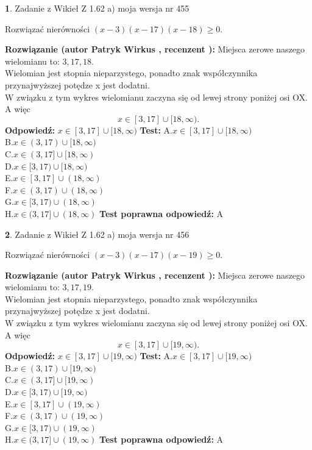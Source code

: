\documentclass[12pt, a4paper]{article}
\theoremstyle{definition} %
\newtheorem{zad}{}
\newcommand{\zadStart}[1]{\begin{zad}#1\newline}
\newcommand{\zadStop}{\end{zad}}
\newcommand{\rozwStart}[2]{\noindent \textbf{Rozwiązanie (autor #1 , recenzent #2): }\newline}
\newcommand{\rozwStop}{\newline}
\newcommand{\odpStart}{\noindent \textbf{Odpowiedź:}\newline}
\newcommand{\odpStop}{\newline}
\newcommand{\testStart}{\noindent \textbf{Test:}\newline}
\newcommand{\testStop}{\newline}
\newcommand{\kluczStart}{\noindent \textbf{Test poprawna odpowiedź:}\newline}
\newcommand{\kluczStop}{\newline}
\begin{document}
\zadStart{Zadanie z Wikieł Z 1.62 a) moja wersja nr 455}

Rozwiązać nierówności $(x-3)(x-17)(x-18)\ge0$.
\zadStop
\rozwStart{Patryk Wirkus}{}
Miejsca zerowe naszego wielomianu to: $3, 17, 18$.\\
Wielomian jest stopnia nieparzystego, ponadto znak współczynnika przy\linebreak najwyższej potędze x jest dodatni.\\ W związku z tym wykres wielomianu zaczyna się od lewej strony poniżej osi OX. A więc $$x \in [3,17] \cup [18,\infty).$$
\rozwStop
\odpStart
$x \in [3,17] \cup [18,\infty)$
\odpStop
\testStart
A.$x \in [3,17] \cup [18,\infty)$\\
B.$x \in (3,17) \cup [18,\infty)$\\
C.$x \in (3,17] \cup [18,\infty)$\\
D.$x \in [3,17) \cup [18,\infty)$\\
E.$x \in [3,17] \cup (18,\infty)$\\
F.$x \in (3,17) \cup (18,\infty)$\\
G.$x \in [3,17) \cup (18,\infty)$\\
H.$x \in (3,17] \cup (18,\infty)$
\testStop
\kluczStart
A
\kluczStop



\zadStart{Zadanie z Wikieł Z 1.62 a) moja wersja nr 456}

Rozwiązać nierówności $(x-3)(x-17)(x-19)\ge0$.
\zadStop
\rozwStart{Patryk Wirkus}{}
Miejsca zerowe naszego wielomianu to: $3, 17, 19$.\\
Wielomian jest stopnia nieparzystego, ponadto znak współczynnika przy\linebreak najwyższej potędze x jest dodatni.\\ W związku z tym wykres wielomianu zaczyna się od lewej strony poniżej osi OX. A więc $$x \in [3,17] \cup [19,\infty).$$
\rozwStop
\odpStart
$x \in [3,17] \cup [19,\infty)$
\odpStop
\testStart
A.$x \in [3,17] \cup [19,\infty)$\\
B.$x \in (3,17) \cup [19,\infty)$\\
C.$x \in (3,17] \cup [19,\infty)$\\
D.$x \in [3,17) \cup [19,\infty)$\\
E.$x \in [3,17] \cup (19,\infty)$\\
F.$x \in (3,17) \cup (19,\infty)$\\
G.$x \in [3,17) \cup (19,\infty)$\\
H.$x \in (3,17] \cup (19,\infty)$
\testStop
\kluczStart
A
\kluczStop
\end{document}
